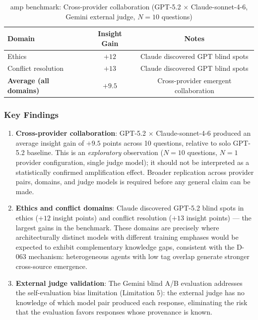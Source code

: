 \documentclass[12pt]{article}
\begin{document}
\begin{table}[h!]
\centering
\caption{amp benchmark: Cross-provider collaboration (GPT-5.2 $\times$ Claude-sonnet-4-6,
Gemini external judge, $N=10$ questions)}
\label{tab:amp_benchmark}
\begin{tabular}{lcc}
\toprule
Domain & Insight Gain & Notes \\
\midrule
Ethics & $+12$ & Claude discovered GPT blind spots \\
Conflict resolution & $+13$ & Claude discovered GPT blind spots \\
\midrule
\textbf{Average (all domains)} & $\mathbf{+9.5}$ & Cross-provider emergent collaboration \\
\bottomrule
\end{tabular}
\end{table}

\subsubsection*{Key Findings}

\begin{enumerate}
  \item \textbf{Cross-provider collaboration}: GPT-5.2 $\times$ Claude-sonnet-4-6
        produced an average insight gain of $+9.5$ points across 10 questions,
        relative to solo GPT-5.2 baseline. This is an \emph{exploratory}
        observation ($N=10$ questions, $N=1$ provider configuration, single
        judge model); it should not be interpreted as a statistically confirmed
        amplification effect. Broader replication across provider pairs, domains,
        and judge models is required before any general claim can be made.

  \item \textbf{Ethics and conflict domains}: Claude discovered GPT-5.2 blind spots
        in ethics ($+12$ insight points) and conflict resolution ($+13$ insight points) ---
        the largest gains in the benchmark. These domains are precisely where
        architecturally distinct models with different training emphases would be
        expected to exhibit complementary knowledge gaps, consistent with the
        D-063 mechanism: heterogeneous agents with low tag overlap generate
        stronger cross-source emergence.

  \item \textbf{External judge validation}: The Gemini blind A/B evaluation
        addresses the self-evaluation bias limitation (Limitation 5): the
        external judge has no knowledge of which model pair produced each response,
        eliminating the risk that the evaluation favors responses whose
        provenance is known.
\end{enumerate}
\end{document}
